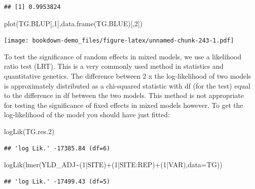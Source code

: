 \documentclass[
]{book}
\newenvironment{Shaded}{\begin{snugshade}}{\end{snugshade}}
\newcommand{\AttributeTok}[1]{\textcolor[rgb]{0.77,0.63,0.00}{#1}}
\newcommand{\DecValTok}[1]{\textcolor[rgb]{0.00,0.00,0.81}{#1}}
\newcommand{\FloatTok}[1]{\textcolor[rgb]{0.00,0.00,0.81}{#1}}
\newcommand{\FunctionTok}[1]{\textcolor[rgb]{0.00,0.00,0.00}{#1}}
\newcommand{\NormalTok}[1]{#1}
\newcommand{\SpecialCharTok}[1]{\textcolor[rgb]{0.00,0.00,0.00}{#1}}
\begin{document}
\begin{verbatim}
## [1] 0.9953824
\end{verbatim}

\begin{Shaded}
\begin{Highlighting}[]
\FunctionTok{plot}\NormalTok{(TG.BLUP[,}\DecValTok{1}\NormalTok{],}\FunctionTok{data.frame}\NormalTok{(TG.BLUE)[,}\DecValTok{2}\NormalTok{])}
\end{Highlighting}
\end{Shaded}

\texttt{[image: bookdown-demo\_files/figure-latex/unnamed-chunk-243-1.pdf]}

To test the significance of random effects in mixed models, we use a likelihood ratio test (LRT). This is a very commonly used method in statistics and quantitative genetics. The difference between 2 x the log-likelihood of two models is approximately distributed as a chi-squared statistic with df (for the test) equal to the difference in df between the two models. This method is not appropriate for testing the significance of fixed effects in mixed models however. To get the log-likelihood of the model you should have just fitted:

\begin{Shaded}
\begin{Highlighting}[]
\FunctionTok{logLik}\NormalTok{(TG.res}\FloatTok{.2}\NormalTok{)}
\end{Highlighting}
\end{Shaded}

\begin{verbatim}
## 'log Lik.' -17385.84 (df=6)
\end{verbatim}

\begin{Shaded}
\begin{Highlighting}[]
\FunctionTok{logLik}\NormalTok{(}\FunctionTok{lmer}\NormalTok{(YLD\_ADJ}\SpecialCharTok{\textasciitilde{}}\NormalTok{(}\DecValTok{1}\SpecialCharTok{|}\NormalTok{SITE)}\SpecialCharTok{+}\NormalTok{(}\DecValTok{1}\SpecialCharTok{|}\NormalTok{SITE}\SpecialCharTok{:}\NormalTok{REP)}\SpecialCharTok{+}\NormalTok{(}\DecValTok{1}\SpecialCharTok{|}\NormalTok{VAR),}\AttributeTok{data=}\NormalTok{TG))}
\end{Highlighting}
\end{Shaded}

\begin{verbatim}
## 'log Lik.' -17499.43 (df=5)
\end{verbatim}
\end{document}

